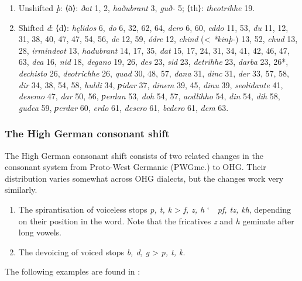 \begin{enumerate}
  \item Unshifted \emph{þ}: ⟨ð⟩: \emph{ðat} 1, 2, \emph{haðubrant} 3, \emph{guð-} 5; ⟨th⟩: \emph{theotrihhe} 19.
  \item Shifted \emph{d}: ⟨d⟩: \emph{hęlidos} 6, \emph{do} 6, 32, 62, 64, \emph{dero} 6, 60, \emph{eddo} 11, 53, \emph{du} 11, 12, 31, 38, 40, 47, 47, 54, 56, \emph{de} 12, 59, \emph{ódre} 12, %
  \emph{chind} (< \emph{*kinþ-}) 13, 52, \emph{chud} 13, 28, \emph{irmindeot} 13, %
  \emph{hadubrant} 14, 17, 35, \emph{dat} 15, 17, 24, 31, 34, 41, 42, 46, 47, 63, \emph{dea} 16, \emph{nid} 18, \emph{degano} 19, 26, \emph{des} 23, \emph{sid} 23, \emph{detrihhe} 23, \emph{darba} 23, 26*, \emph{dechisto} 26, \emph{deotrichhe} 26, \emph{quad} 30, 48, 57, \emph{dana} 31, \emph{dinc} 31, \emph{der} 33, 57, 58, \emph{dir} 34, 38, 54, 58, %
  \emph{huldi} 34, \emph{ƿidar} 37, \emph{dinem} 39, 45, \emph{dinu} 39, \emph{seolidante} 41, \emph{desemo} 47, \emph{dar} 50, 56, \emph{ƿerdan} 53, \emph{doh} 54, 57, \emph{aodlihho} 54, \emph{din} 54, \emph{dih} 58, \emph{gudea} 59, \emph{ƿerdar} 60, \emph{erdo} 61, \emph{desero} 61, %
  \emph{bedero} 61, \emph{dem} 63. %
\end{enumerate}

\subsubsection{The High German consonant shift}

The High German consonant shift consists of two related changes in the consonant system from Proto-West Germanic (PWGmc.) to OHG.  Their distribution varies somewhat across OHG dialects, but the changes work very similarly.

\begin{enumerate}
  \item The spirantisation of voiceless stops \emph{p, t, k} > \emph{f, z, h} \char`~\ \emph{pf, tz, kh}, depending on their position in the word.  Note that the fricatives \emph{z} and \emph{h} geminate after long vowels.
  \item The devoicing of voiced stops \emph{b, d, g} > \emph{p, t, k}.
\end{enumerate}

The following examples are found in \Hildebrandslied:

